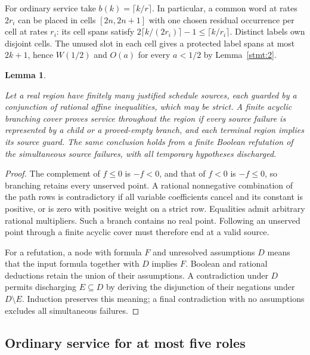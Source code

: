 \documentclass[11pt,a4paper]{article}
\newtheorem{lemma}[theorem]{Lemma}
\begin{document}
For ordinary service take \(b(k)=\lceil k/r\rceil\). In particular, a common word at rates \(2r_i\) can be placed in cells \([2n,2n+1]\) with one chosen residual occurrence per cell at rates \(r_i\): its cell spans satisfy \(2\lceil k/(2r_i)\rceil-1\le\lceil k/r_i\rceil\). Distinct labels own disjoint cells. The unused slot in each cell gives a protected label spans at most \(2k+1\), hence \(W(1/2)\) and \(O(a)\) for every \(a<1/2\) by Lemma~\ref{stmt:2}.

\begin{lemma}\label{stmt:A.4}

 Let a real region have finitely many justified schedule sources, each guarded by a conjunction of rational affine inequalities, which may be strict. A finite acyclic branching cover proves service throughout the region if every source failure is represented by a child or a proved-empty branch, and each terminal region implies its source guard. The same conclusion holds from a finite Boolean refutation of the simultaneous source failures, with all temporary hypotheses discharged.

\end{lemma}

\begin{proof}

 The complement of \(f\le0\) is \(-f<0\), and that of \(f<0\) is \(-f\le0\), so branching retains every unserved point. A rational nonnegative combination of the path rows is contradictory if all variable coefficients cancel and its constant is positive, or is zero with positive weight on a strict row. Equalities admit arbitrary rational multipliers. Such a branch contains no real point. Following an unserved point through a finite acyclic cover must therefore end at a valid source.

For a refutation, a node with formula \(F\) and unresolved assumptions \(D\) means that the input formula together with \(D\) implies \(F\). Boolean and rational deductions retain the union of their assumptions. A contradiction under \(D\) permits discharging \(E\subseteq D\) by deriving the disjunction of their negations under \(D\setminus E\). Induction preserves this meaning; a final contradiction with no assumptions excludes all simultaneous failures. 

\end{proof}

\subsection{Ordinary service for at most five roles}\label{sec:A.2}
\end{document}
